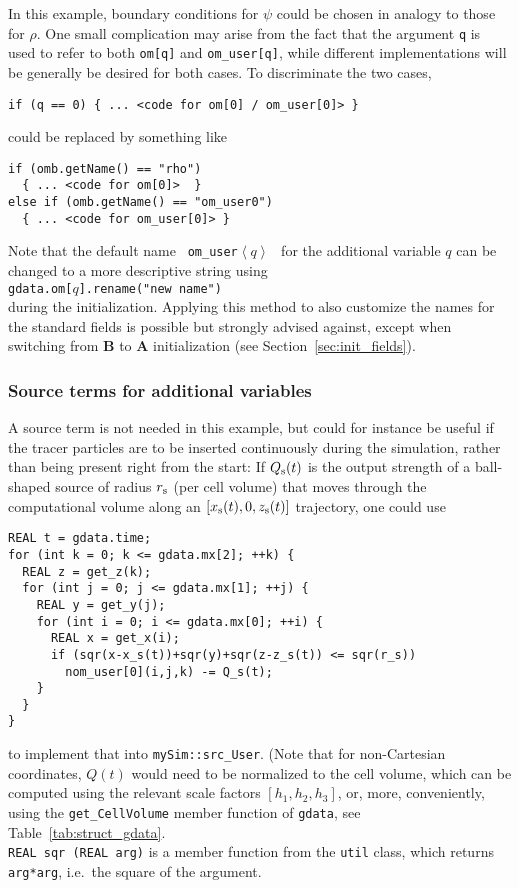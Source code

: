 In this example, boundary conditions for $\psi$ could be chosen in
analogy to those for $\rho$. One small complication may arise from the
fact that the argument {\tt q} is used to refer to both {\tt om[q]}
and {\tt om\_user[q]}, while different implementations will be
generally be desired for both cases. To discriminate the two cases,
\begin{verbatim}
if (q == 0) { ... <code for om[0] / om_user[0]> }
\end{verbatim}
could be replaced by something like
\begin{verbatim}
if (omb.getName() == "rho")
  { ... <code for om[0]>  }
else if (omb.getName() == "om_user0")
  { ... <code for om_user[0]> }
\end{verbatim}
Note that the default name \ {\tt om\_user$\left<q\right>$} \ for the
additional variable $q$ can be changed to a more descriptive string
using \\ 
{\tt gdata.om[$q$].rename("{\rm new name}") } \\
during the initialization. Applying this method to also customize the
names for the standard fields is possible but strongly advised
against, except when switching from {\bf B} to {\bf A} initialization
(see Section~\ref{sec:init_fields}).


\subsubsection{Source terms for additional variables}

A source term is not needed in this example, but
could for instance be useful if the tracer particles are to be
inserted continuously during the simulation, rather than being present
right from the start: If $Q_{\rm s}(t)$ is the output strength of a
ball-shaped source of radius $r_{\rm s}$ (per cell volume) that moves
through the computational volume along an $[x_{\rm s}(t),0,z_{\rm s}(t)]$
trajectory, one could use
\begin{verbatim}
REAL t = gdata.time;
for (int k = 0; k <= gdata.mx[2]; ++k) {
  REAL z = get_z(k);
  for (int j = 0; j <= gdata.mx[1]; ++j) {
    REAL y = get_y(j);
    for (int i = 0; i <= gdata.mx[0]; ++i) {
      REAL x = get_x(i);
      if (sqr(x-x_s(t))+sqr(y)+sqr(z-z_s(t)) <= sqr(r_s))
        nom_user[0](i,j,k) -= Q_s(t);
    }
  }
}
\end{verbatim}
to implement that into  \verb+mySim::src_User+. (Note that for
non-Cartesian coordinates, $Q(t)$ would need to be normalized to the
cell volume, which can be computed using the relevant scale factors
$[h_1,h_2,h_3]$, or, more, conveniently, using the {\tt get\_CellVolume} member
function of {\tt gdata}, see Table~\ref{tab:struct_gdata}.\\
{\tt REAL sqr (REAL arg)} is a member function from the {\tt util} class,
which returns {\tt arg*arg}, i.e.\ the square of the argument.


